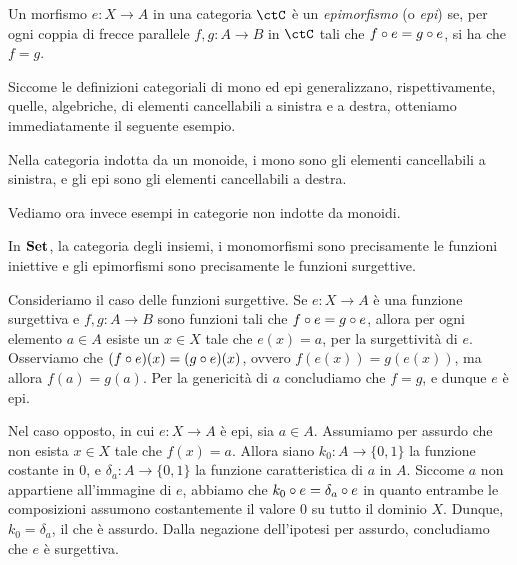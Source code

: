 \begin{definition}[Epimorfismo]
	Un morfismo \(e \colon X \to A\) in una categoria \(\ctC\) è un \emph{epimorfismo} (o \emph{epi}) se,
	per ogni coppia di frecce parallele \(f, g \colon A \to B\) in \(\ctC\) tali che \(f \circ e = g \circ e\), si ha che \(f = g\).
\end{definition}

Siccome le definizioni categoriali di mono ed epi generalizzano, rispettivamente, quelle, algebriche, di elementi cancellabili a sinistra e a destra,
otteniamo immediatamente il seguente esempio.

\begin{example}
	Nella categoria indotta da un monoide, i mono sono gli elementi cancellabili a sinistra,
	e gli epi sono gli elementi cancellabili a destra.
\end{example}

Vediamo ora invece esempi in categorie non indotte da monoidi.

\begin{example}
	In \(\mathbf{Set}\), la categoria degli insiemi, i monomorfismi sono precisamente le funzioni iniettive
	e gli epimorfismi sono precisamente le funzioni surgettive.

	Consideriamo il caso delle funzioni surgettive.
	Se \(e \colon X \to A\) è una funzione surgettiva e \(f, g \colon A \to B\) sono funzioni tali che \(f \circ e = g \circ e\),
	allora per ogni elemento \(a \in A\) esiste un \(x \in X\) tale che \(e(x) = a\), per la surgettività di \(e\).
	Osserviamo che \((f \circ e)(x) = (g \circ e)(x)\), ovvero \(f(e(x)) = g(e(x))\),
	ma allora \(f(a) = g(a)\).
	Per la genericità di \(a\) concludiamo che \(f = g\), e dunque \(e\) è epi.

	Nel caso opposto, in cui \(e \colon X \to A\) è epi, sia \(a \in A\).
	Assumiamo per assurdo che non esista \(x \in X\) tale che \(f(x) = a\).
	Allora siano \(k_0 \colon A \to \{0, 1\}\) la funzione costante in \(0\),
	e \(\delta_a \colon A \to \{0, 1\}\) la funzione caratteristica di \(a\) in \(A\).
	Siccome \(a\) non appartiene all'immagine di \(e\), abbiamo che \(k_0 \circ e = \delta_a \circ e\)
	in quanto entrambe le composizioni assumono costantemente il valore \(0\) su tutto il dominio \(X\).
	Dunque, \(k_0 = \delta_a\), il che è assurdo.
	Dalla negazione dell'ipotesi per assurdo, concludiamo che \(e\) è surgettiva.
\end{example}


